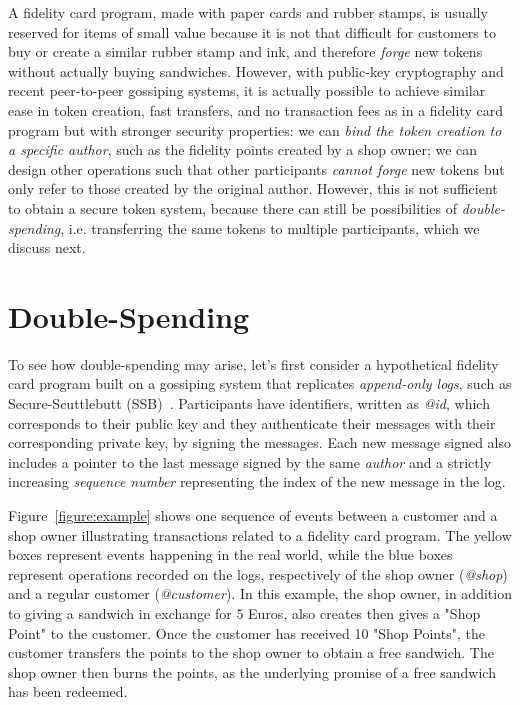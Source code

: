 \documentclass[sigplan,screen,10pt]{acmart}
\begin{document}
A fidelity card program, made with paper cards and rubber stamps, is usually reserved for items of small value because it is not that difficult for customers to buy or create a similar rubber stamp and ink, and therefore \textit{forge} new tokens without actually buying sandwiches. However, with public-key cryptography and recent peer-to-peer gossiping systems, it is actually possible to achieve similar ease in token creation, fast transfers, and no transaction fees as in a fidelity card program but with stronger security properties: we can \textit{bind the token creation to a specific author}, such as the fidelity points created by a shop owner; we can design other operations such that other participants \textit{cannot forge} new tokens but only refer to those created by the original author. However, this is not sufficient to obtain a secure token system, because there can still be possibilities of \textit{double-spending}, i.e. transferring the same tokens to multiple participants, which we discuss next.

\section{Double-Spending}
\label{section:double-spending}

To see how double-spending may arise, let's first consider a hypothetical  fidelity card program built on a gossiping system that replicates \textit{append-only logs}, such as Secure-Scuttlebutt (SSB)~\cite{kermarrec2020gossiping}. Participants have identifiers, written as \textit{@id}, which corresponds to their public key and they authenticate their messages with their corresponding private key, by signing the messages. Each new message signed also includes a pointer to the last message signed by the same \textit{author} and a strictly increasing \textit{sequence number} representing the index of the new message in the log.  

Figure~\ref{figure:example} shows one sequence of events between a customer and a shop owner illustrating transactions related to a fidelity card program.  The yellow boxes represent events happening in the real world, while the blue boxes represent operations recorded on the logs, respectively of the shop owner (\textit{@shop}) and a regular customer (\textit{@customer}). In this example, the shop owner, in addition to giving a sandwich in exchange for $5$ Euros, also creates then gives  a "Shop Point" to the customer. Once the customer has received 10 "Shop Points", the customer transfers the points to the shop owner to obtain a free sandwich. The shop owner then burns the points, as the underlying promise of a free sandwich has been redeemed.
\end{document}
